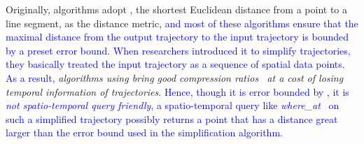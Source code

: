 
Originally, \lsa algorithms adopt \ped, {the shortest Euclidean distance from a point to a line segment, as the distance metric, \textcolor{blue}{and most of these algorithms ensure that the maximal distance from the output trajectory to the input trajectory is bounded by a preset \ped error bound. When researchers introduced it to simplify trajectories, they basically treated the input trajectory as a sequence of spatial data points. As a result,} \emph{\lsa algorithms using \ped bring good compression ratios~\cite{Douglas:Peucker, Hershberger:Speeding, Liu:BQS, Muckell:Compression, Chen:Trajectory, Cao:Spatio, Shi:Survey} at a cost of losing temporal information of trajectories}.} \textcolor{blue}{Hence, though it is error bounded by \ped, it is \emph{not spatio-temporal query friendly}, \ie a spatio-temporal query like \emph{where\_at}~\cite{Cao:Spatio} on such a simplified trajectory possibly returns a point that has a distance great larger than the \ped error bound used in the simplification algorithm. }

